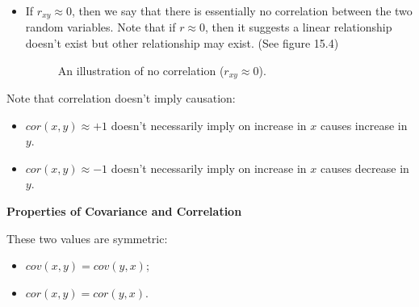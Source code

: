 \begin{itemize}
	\item If $r_{xy} \approx 0$, then we say that there is essentially no correlation between the two random variables. Note that if $r \approx 0$, then it suggests a linear relationship doesn't exist but other relationship may exist. (See figure 15.4)
\begin{figure}[h!]
\begin{center}
\end{center}
\caption{An illustration of no correlation ($r_{xy} \approx 0$).}
\end{figure}
\end{itemize}

Note that correlation doesn't imply causation:

\begin{itemize}
	\item $cor(x,y) \approx +1$ doesn't necessarily imply on increase in $x$ causes increase in $y$.
	\item $cor(x,y) \approx -1$ doesn't necessarily imply on increase in $x$ causes decrease in $y$.
\end{itemize}

\textbf{Properties of Covariance and Correlation}

These two values are symmetric:

\begin{itemize}
	\item $cov(x,y) = cov(y,x)$;
	\item $cor(x,y) = cor(y,x)$.
\end{itemize}

